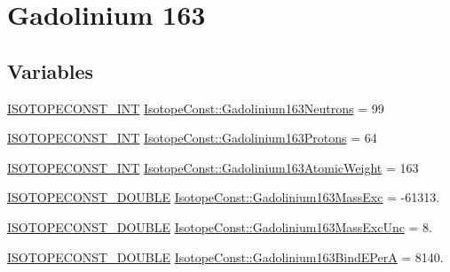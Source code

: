 \hypertarget{group___isotope_const-_gadolinium-_gd163}{}\section{Gadolinium 163}
\label{group___isotope_const-_gadolinium-_gd163}
\subsection*{Variables}
\begin{DoxyCompactItemize}
\item 
\mbox{\hyperlink{group___isotope_const-_macros_ga5f18360b3e99483a35c32d789e62621c}{I\+S\+O\+T\+O\+P\+E\+C\+O\+N\+S\+T\+\_\+\+I\+NT}} \mbox{\hyperlink{group___isotope_const-_gadolinium-_gd163_ga87dfb9e8e682526dcec0c8bbd76fa817}{Isotope\+Const\+::\+Gadolinium163\+Neutrons}} = 99
\item 
\mbox{\hyperlink{group___isotope_const-_macros_ga5f18360b3e99483a35c32d789e62621c}{I\+S\+O\+T\+O\+P\+E\+C\+O\+N\+S\+T\+\_\+\+I\+NT}} \mbox{\hyperlink{group___isotope_const-_gadolinium-_gd163_ga3e083b50bc430fa56d40d145f5c9a063}{Isotope\+Const\+::\+Gadolinium163\+Protons}} = 64
\item 
\mbox{\hyperlink{group___isotope_const-_macros_ga5f18360b3e99483a35c32d789e62621c}{I\+S\+O\+T\+O\+P\+E\+C\+O\+N\+S\+T\+\_\+\+I\+NT}} \mbox{\hyperlink{group___isotope_const-_gadolinium-_gd163_ga1bdc0b8610503dcbbec129d120dc49f1}{Isotope\+Const\+::\+Gadolinium163\+Atomic\+Weight}} = 163
\item 
\mbox{\hyperlink{group___isotope_const-_macros_ga8f45a7272ce02c0b4c65c44636ed719a}{I\+S\+O\+T\+O\+P\+E\+C\+O\+N\+S\+T\+\_\+\+D\+O\+U\+B\+LE}} \mbox{\hyperlink{group___isotope_const-_gadolinium-_gd163_gaccf226375703033fbe6eb35283bba216}{Isotope\+Const\+::\+Gadolinium163\+Mass\+Exc}} = -\/61313.
\item 
\mbox{\hyperlink{group___isotope_const-_macros_ga8f45a7272ce02c0b4c65c44636ed719a}{I\+S\+O\+T\+O\+P\+E\+C\+O\+N\+S\+T\+\_\+\+D\+O\+U\+B\+LE}} \mbox{\hyperlink{group___isotope_const-_gadolinium-_gd163_ga2ddf5b27dff5268c1d7cc63892929b90}{Isotope\+Const\+::\+Gadolinium163\+Mass\+Exc\+Unc}} = 8.
\item 
\mbox{\hyperlink{group___isotope_const-_macros_ga8f45a7272ce02c0b4c65c44636ed719a}{I\+S\+O\+T\+O\+P\+E\+C\+O\+N\+S\+T\+\_\+\+D\+O\+U\+B\+LE}} \mbox{\hyperlink{group___isotope_const-_gadolinium-_gd163_gab24a7c94be745a0adb2334dcdbf11bc9}{Isotope\+Const\+::\+Gadolinium163\+Bind\+E\+PerA}} = 8140.

\end{DoxyCompactItemize}
